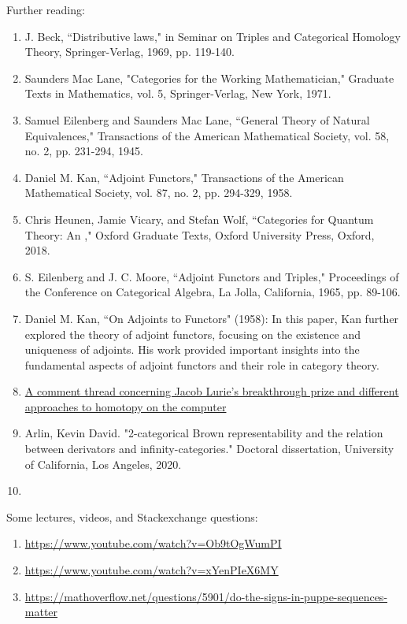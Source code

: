 \documentclass{book}
\theoremstyle{definition}
\begin{document}
Further reading:

\begin{enumerate}
\item J. Beck, ``Distributive laws," in Seminar on Triples and Categorical Homology Theory, Springer-Verlag, 1969, pp. 119-140.
\item Saunders Mac Lane, "Categories for the Working Mathematician," Graduate Texts in Mathematics, vol. 5, Springer-Verlag, New York, 1971.
\item Samuel Eilenberg and Saunders Mac Lane, ``General Theory of Natural Equivalences," Transactions of the American Mathematical Society, vol. 58, no. 2, pp. 231-294, 1945.
\item Daniel M. Kan, ``Adjoint Functors," Transactions of the American Mathematical Society, vol. 87, no. 2, pp. 294-329, 1958.
\item Chris Heunen, Jamie Vicary, and Stefan Wolf, ``Categories for Quantum Theory: An ," Oxford Graduate Texts, Oxford University Press, Oxford, 2018.
\item S. Eilenberg and J. C. Moore, ``Adjoint Functors and Triples," Proceedings of the Conference on Categorical Algebra, La Jolla, California, 1965, pp. 89-106.
\item Daniel M. Kan, ``On Adjoints to Functors" (1958): In this paper, Kan further explored the theory of adjoint functors, focusing on the existence and uniqueness of adjoints. His work provided important insights into the fundamental aspects of adjoint functors and their role in category theory.
\item \href{https://mathematicswithoutapologies.wordpress.com/2015/05/13/univalent-foundations-no-comment/}{A comment thread concerning Jacob Lurie's breakthrough prize and different approaches to homotopy on the computer}
\item Arlin, Kevin David. "2-categorical Brown representability and the relation between derivators and infinity-categories." Doctoral dissertation, University of California, Los Angeles, 2020.
\item 
\end{enumerate}

Some lectures, videos, and Stackexchange questions:

\begin{enumerate}
\item \url{https://www.youtube.com/watch?v=Ob9tOgWumPI}
\item \url{https://www.youtube.com/watch?v=xYenPIeX6MY}
\item \url{https://mathoverflow.net/questions/5901/do-the-signs-in-puppe-sequences-matter}
\end{enumerate}
\end{document}
